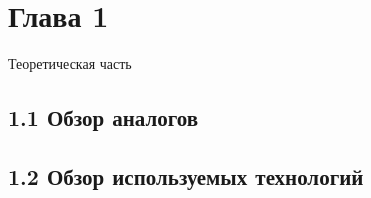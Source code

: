 \section*{Глава 1}

Теоретическая часть

\subsection*{1.1 Обзор аналогов}

\subsection*{1.2 Обзор используемых технологий}

\cite{shen2020interfacegan}
